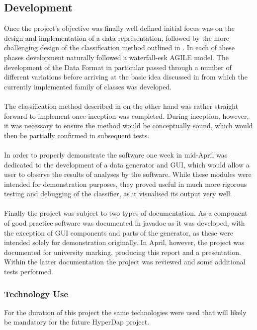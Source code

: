 \documentclass[main.tex]{subfiles}
\begin{document}
    \subsection{Development}
    
      Once the project's objective was finally well defined initial focus was on the design and implementation of a data representation, followed by the more challenging design of the classification method outlined in . In each of these phases development naturally followed a waterfall-esk AGILE model. The development of the Data Format in particular passed through a number of different variations before arriving at the basic idea discussed in  from which the currently implemented family of classes was developed.
      \\\\
      The classification method described in  on the other hand was rather straight forward to implement once inception was completed. During inception, however, it was necessary to ensure the method would be conceptually sound, which would then be partially confirmed in subsequent tests.
      \\\\
      In order to properly demonstrate the software one week in mid-April was dedicated to the development of a data generator and GUI, which would allow a user to observe the results of analyses by the software. While these modules were intended for demonstration purposes, they proved useful in much more rigorous testing and debugging of the classifier, as it visualised its output very well.
      \\\\
      Finally the project was subject to two types of documentation. As a component of good practice software was documented in javadoc as it was developed, with the exception of GUI components and parts of the generator, as these were intended solely for demonstration originally. In April, however, the project was documented for university marking, producing this report and a presentation. Within the latter documentation the project was reviewed and some additional tests performed.
      
      \subsubsection*{Technology Use}
        
        For the duration of this project the same technologies were used that will likely be mandatory for the future HyperDap project.
        
\end{document}
